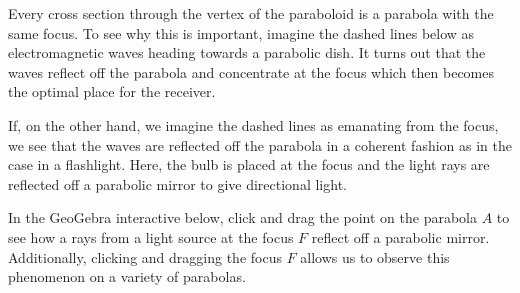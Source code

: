 \documentclass{ximera}
\begin{document}
\begin{center}
\end{center}


Every cross section through the vertex of the paraboloid is a parabola with the same focus.  To see why this is important, imagine the dashed lines below as electromagnetic waves heading towards a parabolic dish.   It turns out that the waves reflect off the parabola and concentrate at the focus which then becomes the optimal place for the receiver. 

 

If, on the other hand, we imagine the dashed lines as emanating from the focus, we see that the waves are reflected off the parabola in a coherent fashion as in the case in a flashlight.  Here, the bulb is placed at the focus and the light rays are reflected off a parabolic mirror to give directional light.

In the GeoGebra interactive below, click and drag the point on the parabola $A$ to see how a rays from a light source at the focus $F$ reflect off a parabolic mirror.  Additionally, clicking and dragging the focus $F$ allows us to observe this phenomenon on a variety of parabolas.


\begin{center}
\end{center}
\end{document}
